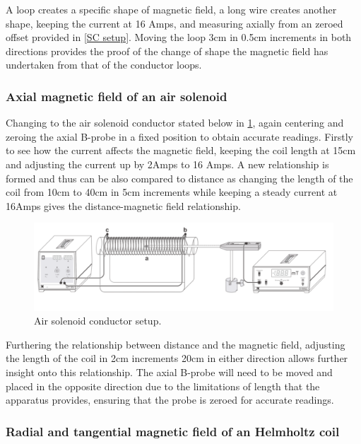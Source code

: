 \documentclass[12pt]{article}
\begin{document}
A loop creates a specific shape of magnetic field, a long wire creates another shape, keeping the current at 16 Amps, and measuring axially from an zeroed offset provided in \cref{SC setup}. Moving the loop 3cm in 0.5cm increments in both directions provides the proof of the change of shape the magnetic field has undertaken from that of the conductor loops.

\subsubsection{Axial magnetic field of an air solenoid}

Changing to the air solenoid conductor stated below in \cref{AS setup}, again centering and zeroing the axial B-probe in a fixed position to obtain accurate readings. Firstly to see how the current affects the magnetic field, keeping the coil length at 15cm and adjusting the current up by 2Amps to 16 Amps. A new relationship is formed and thus can be also compared to distance as changing the length of the coil from 10cm to 40cm in 5cm increments while keeping a steady current at 16Amps gives the distance-magnetic field relationship.

\begin{figure}[H]
\centering
\includegraphics[scale=0.5]{Images/AS.png}
\caption{Air solenoid conductor setup. \cite{Exp.5-2019}}
\label{AS setup}
\end{figure}

Furthering the relationship between distance and the magnetic field, adjusting the length of the coil in 2cm increments 20cm in either direction allows further insight onto this relationship. The axial B-probe will need to be moved and placed in the opposite direction due to the limitations of length that the apparatus provides, ensuring that the probe is zeroed for accurate readings.

\subsubsection{Radial and tangential magnetic field of an Helmholtz coil}
\end{document}
